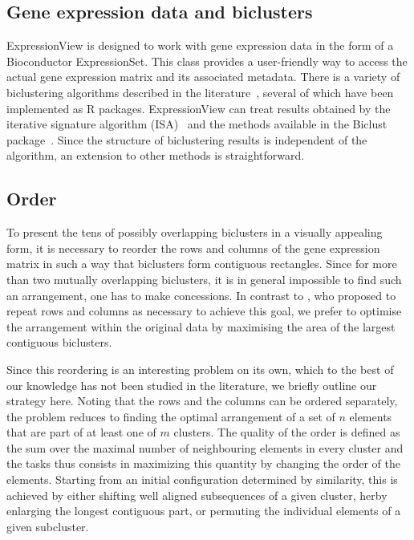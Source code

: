 \documentclass[round]{bioinfo}
\begin{document}
\subsection{Gene expression data and biclusters}
ExpressionView is designed to work with gene expression data in the form of a Bioconductor ExpressionSet. This class provides a user-friendly way to access the actual gene expression matrix and its associated metadata. There is a variety of biclustering algorithms described in the literature~\citep{madeira04,prelic06}, several of which have been implemented as R packages. ExpressionView can treat results obtained by the iterative signature algorithm (ISA)~\citep{bergmann03,csardi09} and the methods available in the Biclust package~\citep{kaiser08}. Since the structure of biclustering results is independent of the algorithm, an extension to other methods is straightforward.

\subsection{Order}
To present the tens of possibly overlapping biclusters in a visually appealing form, it is necessary to reorder the rows and columns of the gene expression matrix in such a way that biclusters form contiguous rectangles. Since for more than two mutually overlapping biclusters, it is in general impossible to find such an arrangement, one has to make concessions. In contrast to \cite{grothaus06}, who proposed to repeat rows and columns as necessary to achieve this goal, we prefer to optimise the arrangement within the original data by maximising the area of the largest contiguous biclusters. 

Since this reordering is an interesting problem on its own, which to the best of our knowledge has not been studied in the literature, we briefly outline our strategy here. Noting that the rows and the columns can be ordered separately, the problem reduces to finding the optimal arrangement of a set of $n$ elements that are part of at least one of $m$ clusters. The quality of the order is defined as the sum over the maximal number of neighbouring elements in every cluster and the tasks thus consists in maximizing this quantity by changing the order of the elements. Starting from an initial configuration determined by similarity, this is achieved by either shifting well aligned subsequences of a given cluster, herby enlarging the longest contiguous part, or permuting the individual elements of a given subcluster. 
\end{document}
